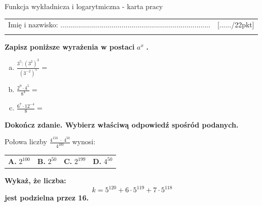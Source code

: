 \documentclass[12pt,a4paper]{article}
\theoremstyle{break}
\begin{document}
	
	\begin{center}
		\LARGE Funkcja wykładnicza i logarytmiczna - karta pracy
	\end{center}
	
	\begin{tabular}{p{13cm} r}
		Imię i nazwisko: ............................................................................
		&[....../22pkt]\\ 
		\vspace{0.5cm}
	\end{tabular}

	\begin{zad}[0-3]
		\textbf{Zapisz poniższe wyrażenia w postaci} $a^x$ \textbf{.}
	\end{zad} 
	
	\begin{enumerate}[a)]\Large
		\item $\frac{3^5:(3^2)^3}{(3^{-2})^5}=$
		\item $\frac{2^9\cdot4^5}{8^4}=$
		\item $\frac{6^7\cdot12^{-4}}{8}=$
	\end{enumerate}
	
	
	\begin{zad}[0-1]
		\textbf{Dokończ zdanie. Wybierz właściwą odpowiedź spośród podanych.}
	\end{zad} 
	
	Połowa liczby \Large$\frac{4^{150}\;\cdot\;4^{50}}{4^{100}}\:$\normalsize wynosi:
	
	\vspace{0.5cm}
	\begin{tabular}{p{3.5cm} p{3.5cm} p{3.5cm} p{3.5cm}}
		\textbf{A. }$2^{100}$&
		\textbf{B. }$2^{50}$&
		\textbf{C. }$2^{199}$&
		\textbf{D. }$4^{50}$\\
	\end{tabular}

	
	\begin{zad}[0-3]
		\textbf{Wykaż, że liczba:}
		$$k=5^{120}+6\cdot5^{119}+7\cdot5^{118}$$
		\textbf{jest podzielna przez 16.}
	\end{zad} 
\end{document}
